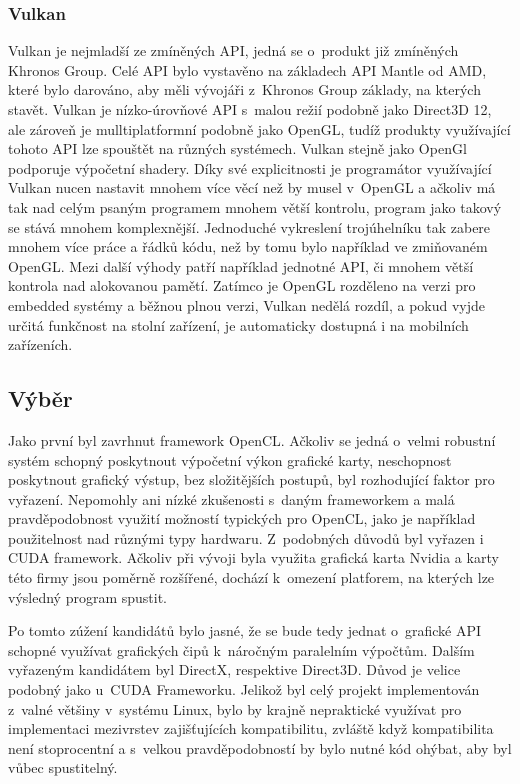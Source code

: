 \subsubsection{Vulkan}
Vulkan je nejmladší ze zmíněných API, jedná se o~produkt již zmíněných Khronos Group. Celé API bylo vystavěno na základech API Mantle od AMD, které bylo darováno, aby měli vývojáři z~Khronos Group základy, na kterých stavět. Vulkan je nízko-úrovňové API s~malou režií podobně jako Direct3D 12, ale zároveň je mulltiplatformní podobně jako OpenGL, tudíž produkty využívající tohoto API lze spouštět na různých systémech. Vulkan stejně jako OpenGl podporuje výpočetní shadery. Díky své explicitnosti je programátor využívající Vulkan nucen nastavit mnohem více věcí než by musel v~OpenGL a ačkoliv má tak nad celým psaným programem mnohem větší kontrolu, program jako takový se stává mnohem komplexnější. Jednoduché vykreslení trojúhelníku tak zabere mnohem více práce a řádků kódu, než by tomu bylo například ve zmiňovaném OpenGL. Mezi další výhody patří například jednotné API, či mnohem větší kontrola nad alokovanou pamětí. Zatímco je OpenGL rozděleno na verzi pro embedded systémy a běžnou plnou verzi, Vulkan nedělá rozdíl, a pokud vyjde určitá funkčnost na stolní zařízení, je automaticky dostupná i na mobilních zařízeních. \cite{singh2016learning} \cite{vulkanSpec}

\subsection{Výběr}
Jako první byl zavrhnut framework OpenCL. Ačkoliv se jedná o~velmi robustní systém schopný poskytnout výpočetní výkon grafické karty, neschopnost poskytnout grafický výstup, bez složitějších postupů, byl rozhodující faktor pro vyřazení. Nepomohly ani nízké zkušenosti s~daným frameworkem a malá pravděpodobnost využití možností typických pro OpenCL, jako je například použitelnost nad různými typy hardwaru. Z~podobných důvodů byl vyřazen i CUDA framework. Ačkoliv při vývoji byla využita grafická karta Nvidia a karty této firmy jsou poměrně rozšířené, dochází k~omezení platforem, na kterých lze výsledný program spustit.

Po tomto zúžení kandidátů bylo jasné, že se bude tedy jednat o~grafické API schopné využívat grafických čipů k~náročným paralelním výpočtům. Dalším vyřazeným kandidátem byl DirectX, respektive Direct3D. Důvod je velice podobný jako u~CUDA Frameworku. Jelikož byl celý projekt implementován z~valné většiny v~systému Linux, bylo by krajně nepraktické využívat pro implementaci mezivrstev zajišťujících kompatibilitu, zvláště když kompatibilita není stoprocentní a s~velkou pravděpodobností by bylo nutné kód ohýbat, aby byl vůbec spustitelný. 

